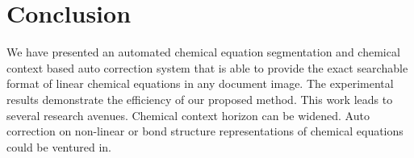 \section{Conclusion}
We have presented an automated chemical equation segmentation and chemical context based auto correction system that is able to provide the exact searchable format of linear chemical equations in any document image. The experimental results demonstrate the efficiency of our proposed method. This work leads to several research avenues. Chemical context horizon can be widened. Auto correction on non-linear or bond structure representations of chemical equations could be ventured in.










